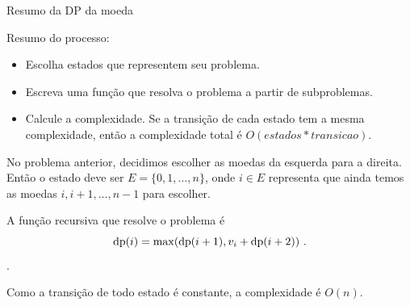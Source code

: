 \begin{frame}{Resumo da DP da moeda}

    Resumo do processo:
    \begin{itemize}
        \item Escolha estados que representem seu problema.
        \item Escreva uma função que resolva o problema a partir de subproblemas.
        \item Calcule a complexidade. Se a transição de cada estado tem a mesma complexidade, então a complexidade total é $O(estados * transicao)$.
    \end{itemize}

    No problema anterior, decidimos escolher as moedas da esquerda para a direita. Então o estado deve ser $E = \{0, 1, \dots, n\}$, onde $i \in E$ representa que ainda temos as moedas $i, i+1, \dots, n-1$ para escolher.

    A função recursiva que resolve o problema é $$\DP(i) = \max(\DP(i+1), v_i + \DP(i+2)) \ .$$.

    Como a transição de todo estado é constante, a complexidade é $O(n)$.
\end{frame}
